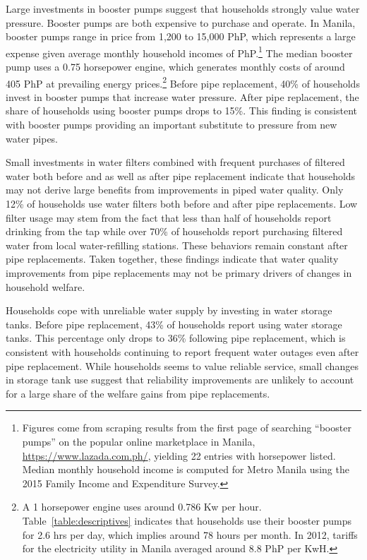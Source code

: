 \documentclass[12pt,table]{article}
\begin{document}
Large investments in booster pumps suggest that households strongly value water pressure.  Booster pumps are both expensive to purchase and operate. In Manila, booster pumps range in price from 1,200 to 15,000 PhP, which represents a large expense given average monthly household incomes of PhP.\footnote{Figures come from scraping results from the first page of searching ``booster pumps'' on the popular online marketplace in Manila, \url{https://www.lazada.com.ph/},  yielding 22 entries with horsepower listed.  Median monthly household income is computed for Metro Manila using the 2015 Family Income and Expenditure Survey.}  The median booster pump uses a 0.75 horsepower engine, which generates monthly costs of around 405 PhP at prevailing energy prices.\footnote{A 1 horsepower engine uses around 0.786 Kw per hour.  Table~\ref{table:descriptives} indicates that households use their booster pumps for 2.6 hrs per day, which implies around 78 hours per month.  In 2012, tariffs for the electricity utility in Manila averaged around 8.8 PhP per KwH.}   Before pipe replacement, 40\% of households invest in booster pumps that increase water pressure.  After pipe replacement, the share of households using booster pumps drops to 15\%.  This finding is consistent with booster pumps providing an important substitute to pressure from new water pipes.

Small investments in water filters combined with frequent purchases of filtered water both before and as well as after pipe replacement indicate that households may not derive large benefits from improvements in piped water quality.  Only 12\% of households use water filters both before and after pipe replacements.  Low filter usage may stem from the fact that less than half of households report drinking from the tap while over 70\% of households report purchasing filtered water from local water-refilling stations.  These behaviors remain constant after pipe replacements.  Taken together, these findings indicate that water quality improvements from pipe replacements may not be primary drivers of changes in household welfare.

Households cope with unreliable water supply by investing in water storage tanks.  Before pipe replacement, 43\% of households report using water storage tanks.  This percentage only drops to 36\% following pipe replacement, which is consistent with households continuing to report frequent water outages even after pipe replacement.  While households seems to value reliable service, small changes in storage tank use suggest that reliability improvements are unlikely to account for a large share of the welfare gains from pipe replacements.
\end{document}
